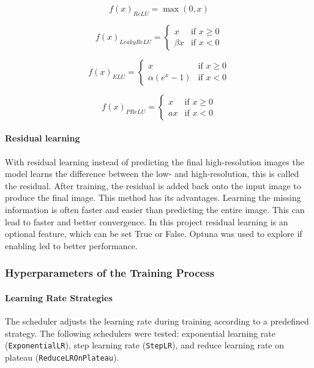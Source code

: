 \documentclass[twocolumn]{article}
\begin{document}
\begin{equation}\label{eq:4}
    f(x)_{ReLU} = \max(0, x)
\end{equation}

\begin{equation}\label{eq:5}
f(x)_{LeakyReLU} = 
\begin{cases}
x & \text{if } x \geq 0 \\
\beta x & \text{if } x < 0
\end{cases}
\end{equation}

\begin{equation}\label{eq:6}
f(x)_{ELU} = 
\begin{cases}
x & \text{if } x \geq 0 \\
\alpha (e^x - 1) & \text{if } x < 0
\end{cases}
\end{equation}


\begin{equation}\label{eq:7}
f(x)_{PReLU} = 
\begin{cases}
x & \text{if } x \geq 0 \\
a x & \text{if } x < 0
\end{cases}
\end{equation}

\paragraph{Residual learning}
With residual learning instead of predicting the final high-resolution images the model learns the difference between the low- and high-resolution, this is called the residual. 
After training, the residual is added back onto the input image to produce the final image. This method has its advantages. 
Learning the missing information is often faster and easier than predicting the entire image. This can lead to faster and better convergence. 
In this project residual learning is an optional feature, which can be set True or False. Optuna was used to explore if enabling led to better performance.

\subsubsection{Hyperparameters of the Training Process}\label{hyperparameters training}

\paragraph{Learning Rate Strategies} \label{subsec:LearningRateStrategies}
The scheduler adjusts the learning rate during training according to a predefined strategy.  
The following schedulers were tested: exponential learning rate (\texttt{ExponentialLR}), step learning rate (\texttt{StepLR}), and reduce learning rate on plateau (\texttt{ReduceLROnPlateau}).
\end{document}
